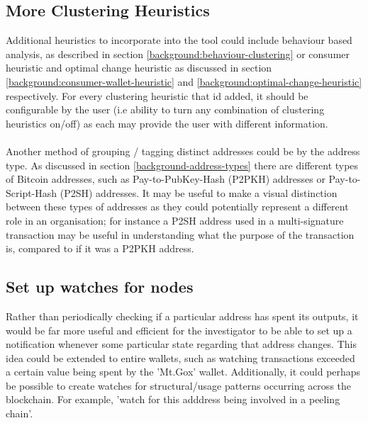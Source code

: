 \subsection{More Clustering Heuristics}
Additional heuristics to incorporate into the tool could include behaviour based analysis, as described in section \ref{background:behaviour-clustering} or consumer heuristic and optimal change heuristic as discussed in section 
\ref{background:consumer-wallet-heuristic} and \ref{background:optimal-change-heuristic} respectively. For every clustering heuristic that id added, it should be configurable by the user (i.e ability to turn any combination of clustering heuristics on/off) as each may provide the user with different information. 
\\\\
Another method of grouping / tagging distinct addresses could be by the address type. As discussed in section \ref{background-address-types} there are different types of Bitcoin addresses, such as Pay-to-PubKey-Hash (P2PKH) addresses or Pay-to-Script-Hash (P2SH) addresses. It may be useful to make a visual distinction between these types of addresses as they could potentially represent a different role in an organisation; for instance a P2SH address used in a multi-signature transaction may be useful in understanding what the purpose of the transaction is, compared to if it was a P2PKH address. 

\subsection{Set up watches for nodes}
Rather than periodically checking if a particular address has spent its outputs, it would be far more useful and efficient for the investigator to be able to set up a notification whenever some particular state regarding that address changes. This idea could be extended to entire wallets, such as watching transactions exceeded a certain value being spent by the 'Mt.Gox' wallet. Additionally, it could perhaps be possible to create watches for structural/usage patterns occurring across the blockchain. For example, 'watch for this adddress being involved in a peeling chain'. 

